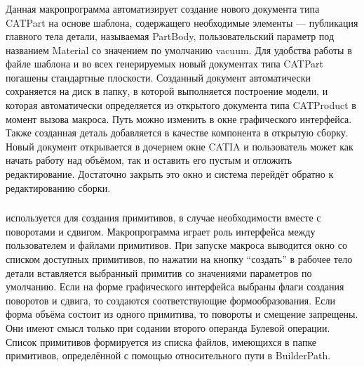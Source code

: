 \subsubsection{}\label{sec:secMacroAddNewPart}

Данная макропрограмма автоматизирует создание нового документа типа CATPart на основе шаблона, содержащего необходимые элементы --- публикация главного тела детали, называемая PartBody, пользовательский параметр под названием Material со значением по умолчанию vacuum. Для удобства работы в файле шаблона и во всех генерируемых новый документах типа CATPart погашены стандартные плоскости. Созданный документ автоматически сохраняется на диск в папку, в которой выполняется построение модели, и которая автоматически определяется из открытого документа типа CATProduct в момент вызова макроса. Путь можно изменить в окне графического интерфейса. Также созданная деталь добавляется в качестве компонента в открытую сборку. Новый документ открывается в дочернем окне CATIA и пользователь может как начать работу над объёмом, так и оставить его пустым и отложить редактирование. Достаточно закрыть это окно и система перейдёт обратно к редактированию сборки.

\subsubsection{}\label{sec:secMacroAddShape}

 используется для создания примитивов, в случае необходимости вместе с поворотами и сдвигом. Макропрограмма играет роль интерфейса между пользователем и файлами примитивов. При запуске макроса выводится окно со списком доступных примитивов, по нажатии на кнопку ``создать'' в рабочее тело детали вставляется выбранный примитив со значениями параметров по умолчанию. Если на форме графического интерфейса выбраны флаги создания поворотов и сдвига, то создаются соответствующие формообразования. Если форма объёма состоит из одного примитива, то повороты и смещение запрещены. Они имеют смысл только при содании второго операнда Булевой операции. Список примитивов формируется из списка файлов, имеющихся в папке примитивов, определённой с помощью относительного пути в BuilderPath.

\subsubsection{}\label{sec:secMacroPoly}

